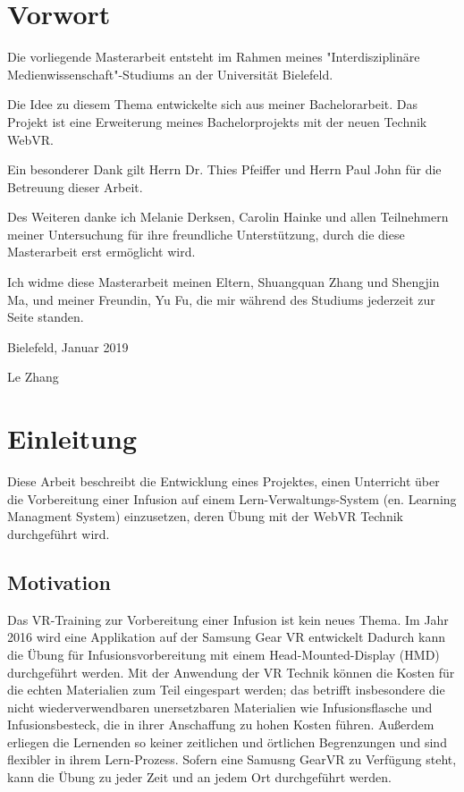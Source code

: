 \chapter*{Vorwort}

Die vorliegende Masterarbeit entsteht im Rahmen meines "Interdisziplinäre Medienwissenschaft"-Studiums an der Universität Bielefeld.
 
Die Idee zu diesem Thema entwickelte sich aus meiner Bachelorarbeit. Das Projekt ist eine Erweiterung meines Bachelorprojekts mit der neuen Technik WebVR.
 
Ein besonderer Dank gilt Herrn Dr. Thies Pfeiffer und Herrn Paul John für die Betreuung dieser Arbeit.
 
Des Weiteren danke ich Melanie Derksen, Carolin Hainke und allen Teilnehmern meiner Untersuchung für ihre freundliche Unterstützung, durch die diese Masterarbeit erst ermöglicht wird.
 
Ich widme diese Masterarbeit meinen Eltern, Shuangquan Zhang und Shengjin Ma, und meiner Freundin, Yu Fu, die mir während des Studiums jederzeit zur Seite standen.

\vspace{5mm}
 
Bielefeld, Januar 2019
 
Le Zhang

\chapter{Einleitung}
Diese Arbeit beschreibt die Entwicklung eines Projektes, einen Unterricht über die Vorbereitung einer Infusion auf einem Lern-Verwaltungs-System (en. Learning Managment System) einzusetzen, deren Übung mit der WebVR Technik durchgeführt wird.

\section{Motivation}

Das VR-Training zur Vorbereitung einer Infusion ist kein neues Thema. Im Jahr 2016 wird eine Applikation auf der Samsung Gear VR entwickelt\citep{26}
Dadurch kann die Übung für Infusionsvorbereitung mit einem Head-Mounted-Display (HMD) durchgeführt werden. Mit der Anwendung der VR Technik können die Kosten für die echten Materialien zum Teil eingespart werden; das betrifft insbesondere die nicht wiederverwendbaren unersetzbaren Materialien wie Infusionsflasche und Infusionsbesteck, die in ihrer Anschaffung zu hohen Kosten führen. Außerdem erliegen die Lernenden so keiner zeitlichen und örtlichen Begrenzungen und sind flexibler in ihrem Lern-Prozess. Sofern eine Samusng GearVR zu Verfügung steht, kann die Übung zu jeder Zeit und an jedem Ort durchgeführt werden.

